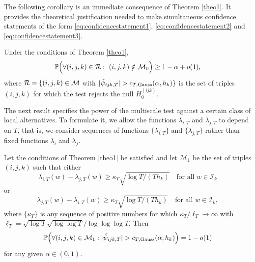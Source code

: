 \documentclass[a4paper,12pt]{article}
\numberwithin{equation}{section}
\begin{document}
The following corollary is an immediate consequence of Theorem \ref{theo1}. It provides the theoretical justification needed to make simultaneous confidence statements of {\color{red} the form \eqref{eq:confidencestatement1}, \eqref{eq:confidencestatement2} and \eqref{eq:confidencestatement3}.}
{\color{red}
\begin{corollaryA}\label{corollary1}
Under the conditions of Theorem \ref{theo1}, 
\[ \pr\Big( \forall (i,j,k) \in \mathcal{R}: \ (i,j,k) \notin \indexset_0 \Big) \ge 1 - \alpha + o(1), \]
where $\mathcal{R} = \{ (i,j,k) \in \mathcal{M}$ with $|\hat{\psi}_{ijk,T}| > c_{T,\textnormal{Gauss}}(\alpha,h_k) \}$ is the set of triples $(i,j,k)$ for which the test rejects the null $H_0^{(ijk)}$.
\end{corollaryA} 


The next result specifies the power of the multiscale test against a certain class of local alternatives. To formulate it, we allow the functions $\lambda_{i, T}$ and $\lambda_{j, T}$ to depend on $T$, that is, we consider sequences of functions $\{\lambda_{i, T}\}$ and $\{\lambda_{j, T}\}$ rather than fixed functions $\lambda_i$ and $\lambda_j$. 
\begin{propA}\label{prop1}
Let the conditions of Theorem \ref{theo1} be satisfied and let $\mathcal{M}_1$ be the set of triples $(i,j,k)$ such that either
\begin{equation}\label{loc-alternative-1}
\lambda_{i, T}(w) - \lambda_{j, T}(w) \ge \kappa_T \sqrt{\log T / (T h_{k})} \quad \text{for all } w \in \mathcal{I}_{k} 
\end{equation}
or 
\begin{equation}\label{loc-alternative-2}
\lambda_{j, T}(w) - \lambda_{i, T}(w) \ge \kappa_T \sqrt{\log T / (T h_{k})} \quad \text{for all } w \in \mathcal{I}_{k}, 
\end{equation}
where $\{\kappa_T\}$ is any sequence of positive numbers for which $\kappa_T / \ell_T \to \infty$ with $\ell_T = \sqrt{\log T} \sqrt{\log \log T} / \log \log \log T$. Then 
\[ \mathbb{P}\Big( \forall (i,j,k) \in \mathcal{M}_1: |\hat{\psi}_{ijk,T}| > c_{T,\textnormal{Gauss}}(\alpha,h_k) \Big) = 1 - o(1) \]
for any given $\alpha \in (0, 1)$. 
\end{propA}}
\end{document}
